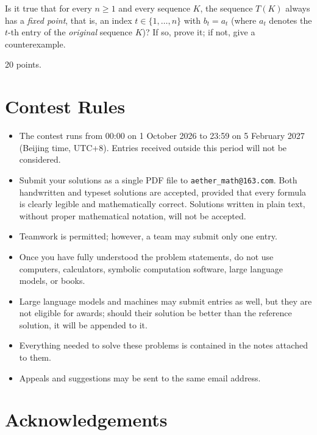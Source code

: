 \documentclass[11pt,a4paper]{article}
\begin{document}
Is it true that for every $n\ge 1$ and every sequence $K$, the sequence
$T(K)$ always has a \emph{fixed point}, that is, an index
$t\in\{1,\ldots ,n\}$ with $b_t=a_t$ (where $a_t$ denotes the $t$-th entry of
the \emph{original} sequence $K$)? If so, prove it; if not, give a
counterexample.

20 points.

\section*{Contest Rules}

\begin{itemize}
\item The contest runs from 00:00 on 1 October 2026 to 23:59 on 5 February
2027 (Beijing time, UTC+8). Entries received outside this period will not be
considered.

\item Submit your solutions as a single PDF file to
\texttt{aether\_math@163.com}. Both handwritten and typeset solutions are
accepted, provided that every formula is clearly legible and mathematically
correct. Solutions written in plain text, without proper mathematical
notation, will not be accepted.

\item Teamwork is permitted; however, a team may submit only one entry.

\item Once you have fully understood the problem statements, do not use
computers, calculators, symbolic computation software, large language models,
or books.

\item Large language models and machines may submit entries as well, but they
are not eligible for awards; should their solution be better than the
reference solution, it will be appended to it.

\item Everything needed to solve these problems is contained in the notes
attached to them.

\item Appeals and suggestions may be sent to the same email address.
\end{itemize}

\section*{Acknowledgements}
\end{document}
